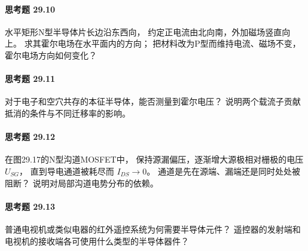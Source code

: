 \paragraph{思考题 29.10}
水平矩形N型半导体片长边沿东西向，
约定正电流由北向南，外加磁场竖直向上。
求其霍尔电场在水平面内的方向；
把材料改为P型而维持电流、磁场不变，霍尔电场方向如何变化？
\paragraph{思考题 29.11}
对于电子和空穴共存的本征半导体，能否测量到霍尔电压？
说明两个载流子贡献抵消的条件与不同迁移率的影响。
\paragraph{思考题 29.12}
在图29.17的N型沟道MOSFET中，
保持源漏偏压，逐渐增大源极相对栅极的电压 \(U_{SG}\)，
直到导电通道被耗尽而 \(I_{DS}\to0\)。
通道是先在源端、漏端还是同时处处被阻断？
说明对局部沟道电势分布的依赖。
\paragraph{思考题 29.13}
普通电视机或类似电器的红外遥控系统为何需要半导体元件？
遥控器的发射端和电视机的接收端各可使用什么类型的半导体器件？
